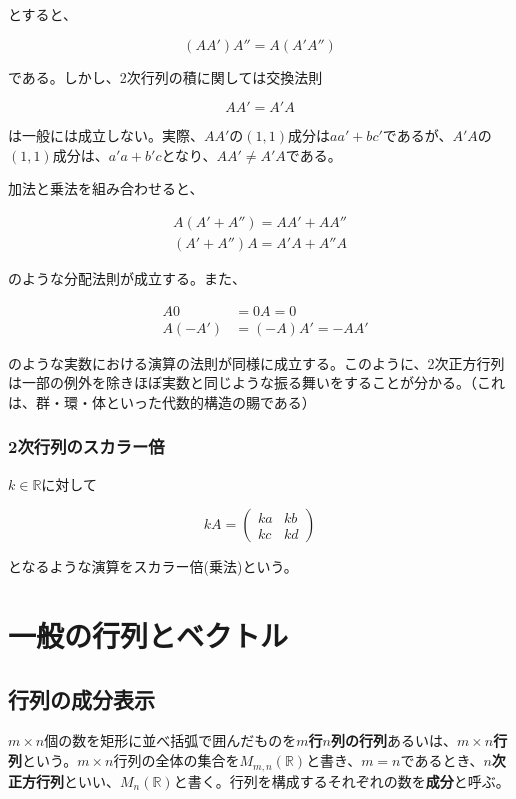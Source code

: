 \documentclass[dvipdfmx,autodetect-engine]{jsarticle}
\begin{document}
とすると、

$$
(AA')A'' = A(A'A'')
$$

である。しかし、2次行列の積に関しては交換法則

$$
AA' = A'A
$$

は一般には成立しない。実際、$AA'$の$(1, 1)$成分は$aa' + bc'$であるが、$A'A$の$(1, 1)$成分は、$a'a + b'c$となり、$AA' \neq A'A$である。

加法と乗法を組み合わせると、

\begin{eqnarray*}
A(A' + A'') = AA' + AA'' \\
(A' + A'')A = A'A + A''A
\end{eqnarray*}

のような分配法則が成立する。また、

\begin{eqnarray*}
&A0 &= 0A = 0 \\
&A(-A') &= (-A)A' = -AA'
\end{eqnarray*}

のような実数における演算の法則が同様に成立する。このように、2次正方行列は一部の例外を除きほぼ実数と同じような振る舞いをすることが分かる。（これは、群・環・体といった代数的構造の賜である）


\subsubsection{2次行列のスカラー倍}

$k \in \mathbb{R}$に対して

$$
kA = \begin{pmatrix}
ka & kb \\
kc & kd
\end{pmatrix}
$$

となるような演算をスカラー倍(乗法)という。

\section{一般の行列とベクトル}

\subsection{行列の成分表示}

$m \times n$個の数を矩形に並べ括弧で囲んだものを{\bf $m$行$n$列の行列}あるいは、{\bf $m \times n$行列}という。$m \times n$行列の全体の集合を$M_{m,n}(\mathbb{R})$と書き、$m = n$であるとき、{\bf $n$次正方行列}といい、$M_n(\mathbb{R})$と書く。行列を構成するそれぞれの数を{\bf 成分}と呼ぶ。
\end{document}
